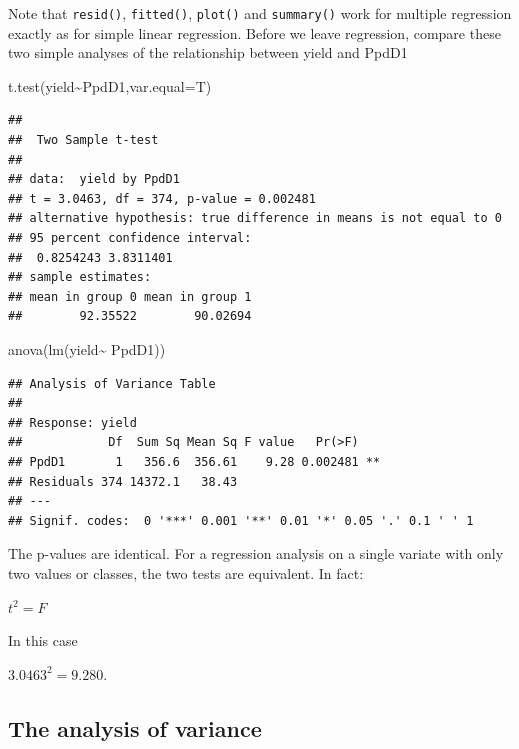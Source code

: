 \documentclass[
]{book}
\newenvironment{Shaded}{\begin{snugshade}}{\end{snugshade}}
\newcommand{\AttributeTok}[1]{\textcolor[rgb]{0.77,0.63,0.00}{#1}}
\newcommand{\FunctionTok}[1]{\textcolor[rgb]{0.00,0.00,0.00}{#1}}
\newcommand{\NormalTok}[1]{#1}
\newcommand{\SpecialCharTok}[1]{\textcolor[rgb]{0.00,0.00,0.00}{#1}}
\begin{document}
Note that \texttt{resid()}, \texttt{fitted()}, \texttt{plot()} and \texttt{summary()} work for multiple regression exactly as for simple linear regression.
Before we leave regression, compare these two simple analyses of the relationship between yield and PpdD1

\begin{Shaded}
\begin{Highlighting}[]
\FunctionTok{t.test}\NormalTok{(yield}\SpecialCharTok{\textasciitilde{}}\NormalTok{PpdD1,}\AttributeTok{var.equal=}\NormalTok{T)}
\end{Highlighting}
\end{Shaded}

\begin{verbatim}
## 
##  Two Sample t-test
## 
## data:  yield by PpdD1
## t = 3.0463, df = 374, p-value = 0.002481
## alternative hypothesis: true difference in means is not equal to 0
## 95 percent confidence interval:
##  0.8254243 3.8311401
## sample estimates:
## mean in group 0 mean in group 1 
##        92.35522        90.02694
\end{verbatim}

\begin{Shaded}
\begin{Highlighting}[]
\FunctionTok{anova}\NormalTok{(}\FunctionTok{lm}\NormalTok{(yield}\SpecialCharTok{\textasciitilde{}}\NormalTok{ PpdD1))}
\end{Highlighting}
\end{Shaded}

\begin{verbatim}
## Analysis of Variance Table
## 
## Response: yield
##            Df  Sum Sq Mean Sq F value   Pr(>F)   
## PpdD1       1   356.6  356.61    9.28 0.002481 **
## Residuals 374 14372.1   38.43                    
## ---
## Signif. codes:  0 '***' 0.001 '**' 0.01 '*' 0.05 '.' 0.1 ' ' 1
\end{verbatim}

The p-values are identical. For a regression analysis on a single variate with only two values or classes, the two tests are equivalent. In fact:

\(t^2 = F\)

In this case

\(3.0463^2 = 9.280\).

\hypertarget{the-analysis-of-variance}{%
\subsection{The analysis of variance}\label{the-analysis-of-variance}}
\end{document}
